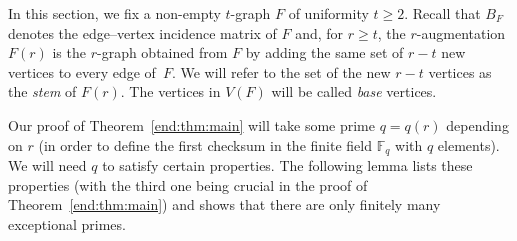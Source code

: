 \documentclass[12pt,a4paper]{article}
\numberwithin{equation}{section}
\newtheorem{lemma}[theorem]{Lemma}
\theoremstyle{definition}
\newtheorem{definition}[theorem]{Definition}
\theoremstyle{remark}
\newcommand{\hide}[1]{{\color{DarkGreen}#1}}
\renewcommand{\hide}[1]{}
\newcommand{\V}[1]{\boldsymbol{#1}}
\begin{document}




In this section, we fix a non-empty $t$-graph $F$ of uniformity $t\ge 2$. Recall that $B_F$ denotes the edge--vertex incidence matrix of $F$ and, for $r\ge t$, the $r$-augmentation $F(r)$ is the $r$-graph obtained from $F$ by adding the same set of $r-t$ new vertices to every edge of~$F$. We will refer to the set of the new $r-t$ vertices as the \emph{stem} of $F(r)$. The vertices in $V(F)$ will be called \emph{base} vertices.

\hide{
It will be convenient to operate with the following property, which we show in Lemma~\ref{lem:app-rank-rigidity} to be equivalent to $B_F$ having zero kernel.

\begin{definition}\label{def:app-sum-rigid}
Call the  $t$-graph $F$  \emph{sum-rigid} if, whenever real numbers $d$ and $(x_v)_{v\in V(F)}$ satisfy
\[
 \sum_{v\in e}x_v=d
 \quad\text{for every }e\in E(F),
\]
then all the numbers $x_v$ for $v\in V(F)$ are equal.
\end{definition}

\begin{lemma}\label{lem:app-rank-rigidity}
The $t$-graph $F$ is sum-rigid if and only if the matrix $B_F$ has zero kernel over $\mathbb R$.
\end{lemma}

\begin{proof} Suppose first that $B_F$ has zero kernel and that all edge sums of a vector $\V{x}\in \mathbb R^{V(F)}$ are equal to $d$.  Since every edge of $F$ has $t$ vertices, it holds that
$B_F\mathbf 1=t\mathbf 1$.
Hence
\[
 B_F\left(\V{x}-\frac dt\mathbf 1\right)=\V{0}.
\]
The kernel of $B_F$ is trivial by our assumption, so $\V{x}=(d/t)\mathbf 1$ and $F$ is sum-rigid.

Conversely, suppose that $F$ is sum-rigid and $B_F\V{x}=0$ for some vector $\V{x}\in \mathbb R^{V(F)}$.  All edge sums of $\V{x}$ are equal to zero, so $\V{x}=c\mathbf 1$ for some $c\in\mathbb R$ by the rigidity assumption.  Then
\[
 0=B_F\V{x}=B_F (c\mathbf 1)=cB_F\mathbf 1=ct\mathbf 1,
\]
which gives $c=0$.  Thus the kernel of $B_F$ is trivial, as desired.
\end{proof}
}



Our proof of Theorem~\ref{end:thm:main} will take some prime $q=q(r)$ depending on $r$ (in order to define the first checksum in the finite field $\mathbb F_q$ with $q$ elements). We will need $q$ to satisfy certain properties.  The following lemma lists these properties (with the third one being crucial in the proof of Theorem~\ref{end:thm:main}) and shows that there are only finitely many exceptional primes.
\end{document}
